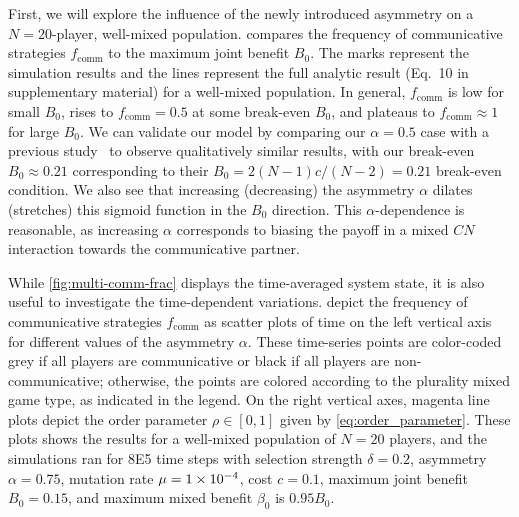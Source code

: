 \documentclass[pdflatex,lineno,referee,sn-nature]{sn-jnl}
\begin{document}
First, we will explore the influence of the newly introduced asymmetry
on a $N=20$-player, well-mixed population.
 compares the frequency of communicative strategies
$f_{\text{comm}}$ to the maximum joint benefit $B_0$.
The marks represent the simulation results
and the lines represent the full analytic
result (Eq.\ 10 in supplementary material) for a well-mixed population.
In general, $f_{\text{comm}}$ is low for small $B_0$,
rises to $f_{\text{comm}} = 0.5$ at some break-even $B_0$,
and plateaus to $f_{\text{comm}} \approx 1$ for large $B_0$.
We can validate our model by comparing our
$\alpha = 0.5$ case with a previous study~\citep{tripp2022evolutionary}
to observe qualitatively similar results,
with our break-even $B_0 \approx 0.21$
corresponding to their $B_0 = 2 (N-1) c/(N-2) = 0.21$ break-even condition.
We also see that increasing (decreasing)
the asymmetry $\alpha$ dilates (stretches) this sigmoid function
in the $B_0$ direction.
This $\alpha$-dependence is reasonable,
as increasing $\alpha$ corresponds to biasing the payoff
in a mixed $CN$ interaction towards the communicative partner.

While \cref{fig:multi-comm-frac} displays
the time-averaged system state,
it is also useful to investigate the time-dependent variations.
depict the frequency
of communicative strategies $f_{\text{comm}}$
as scatter plots of time on the left vertical axis
for different values of the asymmetry $\alpha$.
These time-series points are color-coded
grey if all players are communicative or
black if all players are non-communicative;
otherwise, the points are colored according
to the plurality mixed game type, as indicated in the legend.
On the right vertical axes,
magenta line plots depict the order parameter
$\rho \in [0,1]$
given by \cref{eq:order_parameter}.
These plots shows the results
for a well-mixed population of $N=20$ players,
and the simulations ran
for \num{8E5} time steps with
selection strength $\delta = 0.2$,
asymmetry $\alpha = 0.75$,
mutation rate $\mu=\num{1E-4}$,
cost $c = \num{0.1}$,
maximum joint benefit $B_0 = 0.15$,
and maximum mixed benefit $\beta_0$ is $\num{0.95} B_0$.
\end{document}
